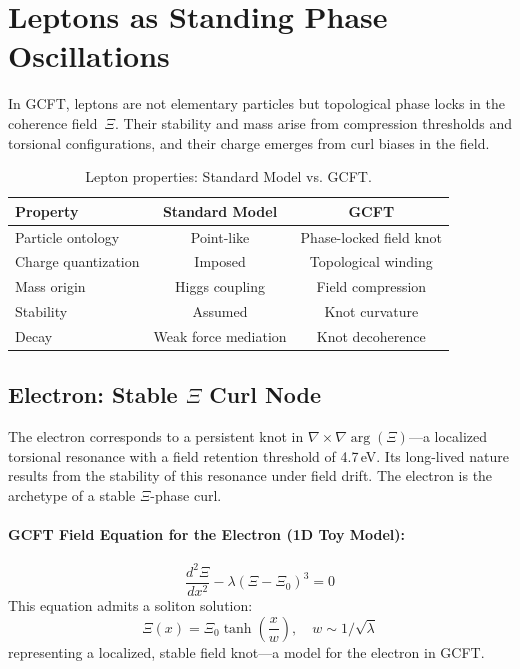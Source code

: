 \section{Leptons as Standing Phase Oscillations}

In GCFT, leptons are not elementary particles but topological phase locks in the coherence field~$\Xi$. Their stability and mass arise from compression thresholds and torsional configurations, and their charge emerges from curl biases in the field.

\begin{table}[ht]
\centering
\begin{tabular}{lcc}
\hline
\textbf{Property} & \textbf{Standard Model} & \textbf{GCFT} \\
\hline
Particle ontology & Point-like & Phase-locked field knot \\
Charge quantization & Imposed & Topological winding \\
Mass origin & Higgs coupling & Field compression \\
Stability & Assumed & Knot curvature \\
Decay & Weak force mediation & Knot decoherence \\
\hline
\end{tabular}
\caption{Lepton properties: Standard Model vs. GCFT.}
\label{tab:lepton_compare}
\end{table}

\subsection{\texorpdfstring{Electron: Stable $\Xi$ Curl Node}{Electron: Stable Xi Curl Node}}

The electron corresponds to a persistent knot in $\nabla \times \nabla \arg(\Xi)$---a localized torsional resonance with a field retention threshold of 4.7\,eV. Its long-lived nature results from the stability of this resonance under field drift. The electron is the archetype of a stable $\Xi$-phase curl.

\paragraph{GCFT Field Equation for the Electron (1D Toy Model):}
\begin{equation}
\frac{d^2\Xi}{dx^2} - \lambda(\Xi - \Xi_0)^3 = 0
\end{equation}
This equation admits a soliton solution:
\begin{equation}
\Xi(x) = \Xi_0 \tanh\left(\frac{x}{w}\right), \quad w \sim 1/\sqrt{\lambda}
\end{equation}
representing a localized, stable field knot---a model for the electron in GCFT.

